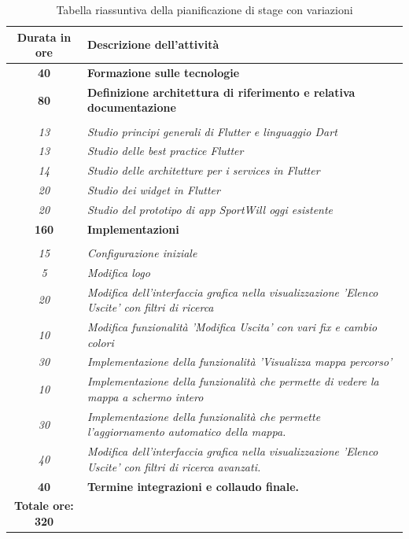 \begin{center}
	\begin{table}[h!]
		
		\label{tab:Tabella riassuntiva della pianificazione di stage con variazioni}
		\begin{tabularx}{\textwidth}{|c|X|}
			
			\hline
			\textbf{Durata in ore} & \textbf{Descrizione dell'attività} \\\hline
			
			\textbf{40} & \textbf{Formazione sulle tecnologie} \\	 
			\hline
			
			\textbf{80} & \textbf{Definizione architettura di riferimento e relativa documentazione} \\  \hdashline
			\multirow{3}{0cm}\\ 
			\textit{13} & 
			\textit{Studio principi generali di Flutter e linguaggio Dart} \\
			\textit{13} & 
			\textit{Studio delle best practice Flutter} \\
			\textit{14} & 
			\textit{Studio delle architetture per i services in Flutter} \\
			\textit{20} & 
			\textit{Studio dei widget in Flutter} \\
			\textit{20} & 
			\textit{Studio del prototipo di app SportWill oggi esistente} \\
			\hline
			\textbf{160} & \textbf{Implementazioni} \\ \hdashline
			\multirow{3}{0cm}\\
			\textit{15} & 
			\textit{Configurazione iniziale} \\ 
			\textit{5} & 
			\textit{Modifica logo} \\ 
			\textit{20} & 
			\textit{Modifica dell’interfaccia grafica nella visualizzazione ’Elenco Uscite’ con filtri di ricerca} \\
			\textit{10} & 
			\textit{Modifica funzionalità 'Modifica Uscita' con vari fix e cambio colori} \\
			\textit{30} & 
			\textit{Implementazione della funzionalità 'Visualizza mappa percorso'} \\
			\textit{10} & 
			\textit{Implementazione della funzionalità che permette di vedere la mappa a schermo intero} \\
			\textit{30} & 
			\textit{Implementazione della funzionalità che permette l'aggiornamento automatico della mappa.} \\
			\textit{40} & 
			\textit{Modifica dell'interfaccia grafica nella visualizzazione 'Elenco Uscite' con filtri di ricerca avanzati.} \\
			\hline
			\textbf{40} & \textbf{Termine integrazioni e collaudo finale.}  \\ 
			\hline
			
			\hline
			\textbf{Totale ore: 320} &  \\\hline	
		\end{tabularx}
		\vspace{0.3cm}
		\caption{Tabella riassuntiva della pianificazione di stage con variazioni}
	\end{table}
\end{center}
\newpage
